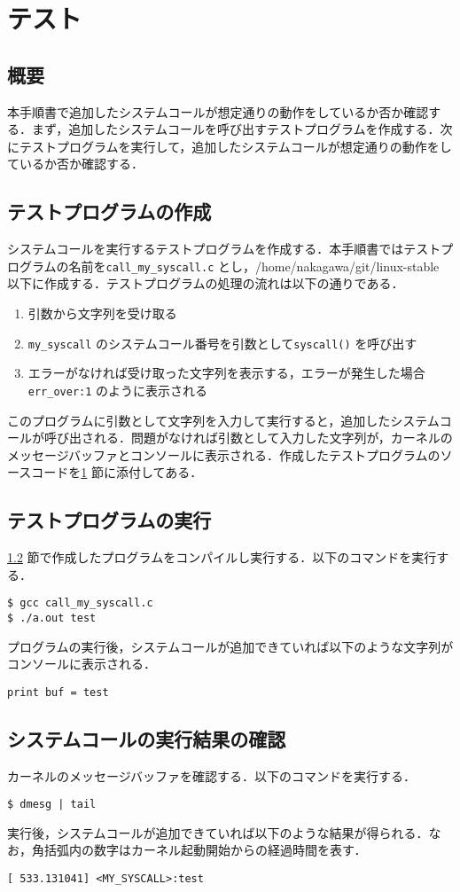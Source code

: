 \documentclass[12pt]{jsarticle}
\begin{document}
\section{テスト}\label{sec:test}
 \subsection{概要}
 本手順書で追加したシステムコールが想定通りの動作をしているか否か確認する．まず，追加したシステムコールを呼び出すテストプログラムを作成する．次にテストプログラムを実行して，追加したシステムコールが想定通りの動作をしているか否か確認する．
\subsection{テストプログラムの作成}\label{sec:test_sakusei}
システムコールを実行するテストプログラムを作成する．本手順書ではテストプログラムの名前を\verb|call_my_syscall.c| とし，/home/nakagawa/git/linux-stable 以下に作成する．テストプログラムの処理の流れは以下の通りである．
\begin{enumerate}
 \item 引数から文字列を受け取る
 \item \verb|my_syscall| のシステムコール番号を引数として\verb|syscall()| を呼び出す
 \item エラーがなければ受け取った文字列を表示する，エラーが発生した場合\verb|err_over:1| のように表示される
\end{enumerate}
このプログラムに引数として文字列を入力して実行すると，追加したシステムコールが呼び出される．問題がなければ引数として入力した文字列が，カーネルのメッセージバッファとコンソールに表示される．作成したテストプログラムのソースコードを\ref{sec:test} 節に添付してある．
\subsection{テストプログラムの実行}
\ref{sec:test_sakusei} 節で作成したプログラムをコンパイルし実行する．以下のコマンドを実行する．
\begin{verbatim}
$ gcc call_my_syscall.c
$ ./a.out test
\end{verbatim}
プログラムの実行後，システムコールが追加できていれば以下のような文字列がコンソールに表示される．
\begin{verbatim}
print buf = test
\end{verbatim}
\subsection{システムコールの実行結果の確認}
カーネルのメッセージバッファを確認する．以下のコマンドを実行する．
\begin{verbatim}
$ dmesg | tail
\end{verbatim}
実行後，システムコールが追加できていれば以下のような結果が得られる．なお，角括弧内の数字はカーネル起動開始からの経過時間を表す．
\begin{verbatim}
[ 533.131041] <MY_SYSCALL>:test
\end{verbatim}
\end{document}

